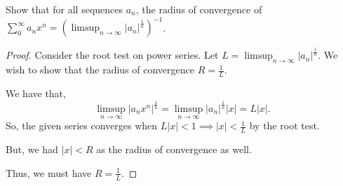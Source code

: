 \documentclass[../hw3]{subfiles}
\begin{document}
\begin{problem}
Show that for all sequences $a_n$, the radius of convergence of $\sum_{0}^{\infty} a_n x^n= {\left( \limsup_{n \to \infty} {|a_n|}^{\frac{1}{n}} \right)}^{-1} $.
\end{problem}
\begin{proof}
	Consider the root test on power series.
	Let $L=\limsup_{n \to \infty} {|a_n|}^{\frac{1}{n}}$.
	We wish to show that the radius of convergence $R = \frac{1}{L}$.

	We have that, \[
		\limsup_{n \to \infty} {|a_n x^n|}^{\frac{1}{n}}=\limsup_{n \to \infty} {|a_n|}^{\frac{1}{n}}|x|=L|x|
		.\]
	So, the given series converges when $L|x|<1 \implies |x|<\frac{1}{L}$ by the root test.

	But, we had $|x|<R$ as the radius of  convergence as well.

	Thus, we must have $R=\frac{1}{L}$.
\end{proof}
\end{document}
